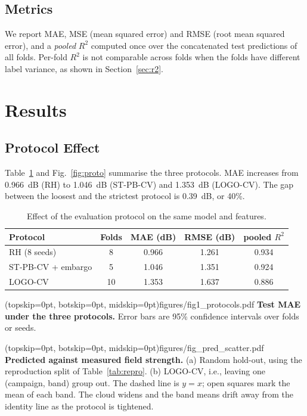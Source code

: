 \documentclass{ieeeaccess}
\begin{document}
\subsection{Metrics}
We report MAE, MSE (mean squared error) and RMSE (root mean squared error), and a \emph{pooled} $R^2$ computed once over the
concatenated test predictions of all folds. Per-fold $R^2$ is not comparable
across folds when the folds have different label variance, as shown in
Section~\ref{sec:r2}.

\section{Results}
\label{sec:results}

\subsection{Protocol Effect}
Table~\ref{tab:proto} and Fig.~\ref{fig:proto} summarise the three protocols. MAE
increases from 0.966~dB (RH) to 1.046~dB (ST-PB-CV) and 1.353~dB (LOGO-CV). The
gap between the loosest and the strictest protocol is 0.39~dB, or 40\%.

\begin{table}
\caption{Effect of the evaluation protocol on the same model and features.}
\label{tab:proto}
\setlength{\tabcolsep}{3pt}
\begin{tabular}{|l|c|c|c|c|}
\hline
Protocol & Folds & MAE (dB) & RMSE (dB) & pooled $R^2$\\
\hline
RH (8 seeds) & 8 & 0.966 & 1.261 & 0.934\\
ST-PB-CV + embargo & 5 & 1.046 & 1.351 & 0.924\\
LOGO-CV & 10 & 1.353 & 1.637 & 0.886\\
\hline
\end{tabular}
\end{table}

\Figure[t!](topskip=0pt, botskip=0pt, midskip=0pt){figures/fig1_protocols.pdf}
{\textbf{Test MAE under the three protocols.} Error bars are 95\% confidence
intervals over folds or seeds.\label{fig:proto}}

\Figure[t!](topskip=0pt, botskip=0pt, midskip=0pt){figures/fig_pred_scatter.pdf}
{\textbf{Predicted against measured field strength.} (a) Random hold-out, using
the reproduction split of Table~\ref{tab:repro}. (b) LOGO-CV, i.e., leaving one
(campaign, band) group out. The
dashed line is $y=x$; open squares mark the mean of each band. The cloud widens
and the band means drift away from the identity line as the protocol is tightened.\label{fig:scatter}}
\end{document}

